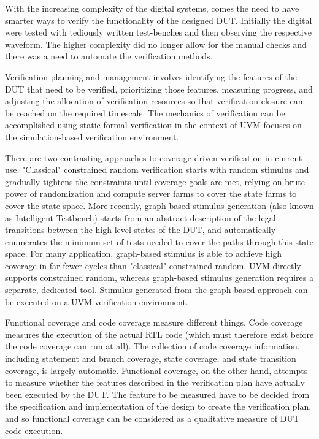 \documentclass[a4paper,11pt]{article}
\begin{document}
With the increasing complexity of the digital systems, comes the need to have smarter ways to verify the functionality of the designed DUT. Initially the digital were tested with tediously written test-benches and then observing the respective waveform. The higher complexity did no longer allow for the manual checks and there was a need to automate the verification methods.

Verification planning and management involves identifying the features of the DUT that need to be verified, prioritizing those features, measuring progress, and adjusting the allocation of verification resources so that verification closure can be reached on the required timescale. The mechanics of verification can be accomplished using static formal verification in the context of UVM focuses on the simulation-based verification environment.

There are two contrasting approaches to coverage-driven verification in current use. "Classical" constrained random verification starts with random stimulus and gradually tightens the constraints until coverage goals are met, relying on brute power of randomization and compute server farms to cover the state farms to cover the state space. More recently, graph-based stimulus generation (also known as Intelligent Testbench) starts from an abstract description of the legal transitions between the high-level states of the DUT, and automatically enumerates the minimum set of tests needed to cover the paths through this state space. For many application, graph-based stimulus is able to achieve high coverage in far fewer cycles than "classical" constrained random. UVM directly supports constrained random, whereas graph-based stimulus generation requires a separate, dedicated tool. Stimulus generated from the graph-based approach can be executed on a UVM verification environment.

Functional coverage and code coverage measure different things. Code coverage measures the execution of the actual RTL code (which must therefore exist before the code coverage can run at all). The collection of code coverage information, including statement and branch coverage, state coverage, and state transition coverage, is largely automatic. Functional coverage, on the other hand, attempts to measure whether the features described in the verification plan have actually been executed by the DUT. The feature to be measured have to be decided from the specification and implementation of the design to create the verification plan, and so functional coverage can be considered as a qualitative measure of DUT code execution. 
\end{document}
